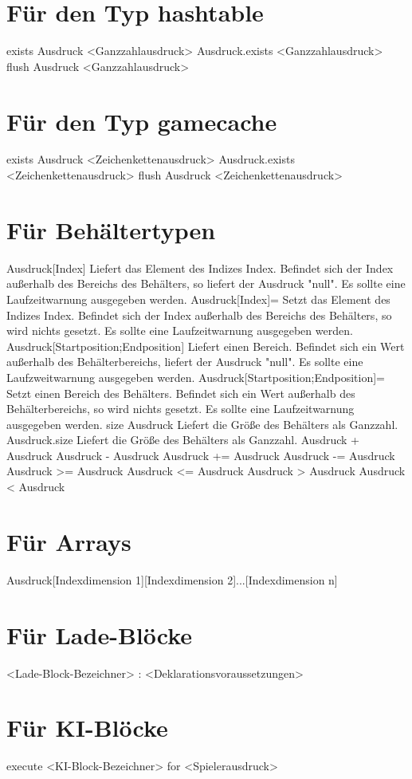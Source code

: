 \section{Für den Typ hashtable}
exists Ausdruck <Ganzzahlausdruck>
Ausdruck.exists <Ganzzahlausdruck>
flush Ausdruck <Ganzzahlausdruck>

\section{Für den Typ gamecache}
exists Ausdruck <Zeichenkettenausdruck>
Ausdruck.exists <Zeichenkettenausdruck>
flush Ausdruck <Zeichenkettenausdruck>

\section{Für Behältertypen}
Ausdruck[Index]					Liefert das Element des Indizes Index. Befindet sich der Index außerhalb des Bereichs des Behälters, so liefert der Ausdruck "null". Es sollte eine Laufzeitwarnung ausgegeben werden.
Ausdruck[Index]=				Setzt das Element des Indizes Index. Befindet sich der Index außerhalb des Bereichs des Behälters, so wird nichts gesetzt. Es sollte eine Laufzeitwarnung ausgegeben werden.
Ausdruck[Startposition;Endposition]		Liefert einen Bereich. Befindet sich ein Wert außerhalb des Behälterbereichs, liefert der Ausdruck "null". Es sollte eine Laufzweitwarnung ausgegeben werden.
Ausdruck[Startposition;Endposition]=		Setzt einen Bereich des Behälters. Befindet sich ein Wert außerhalb des Behälterbereichs, so wird nichts gesetzt. Es sollte eine Laufzeitwarnung ausgegeben werden.
size Ausdruck					Liefert die Größe des Behälters als Ganzzahl.
Ausdruck.size					Liefert die Größe des Behälters als Ganzzahl.
Ausdruck + Ausdruck
Ausdruck - Ausdruck
Ausdruck += Ausdruck
Ausdruck -= Ausdruck
Ausdruck >= Ausdruck
Ausdruck <= Ausdruck
Ausdruck > Ausdruck
Ausdruck < Ausdruck

\section{Für Arrays}
Ausdruck[Indexdimension 1][Indexdimension 2]...[Indexdimension n]

\section{Für Lade-Blöcke}
<Lade-Block-Bezeichner> : <Deklarationsvoraussetzungen>

\section{Für KI-Blöcke}
execute <KI-Block-Bezeichner> for <Spielerausdruck>

